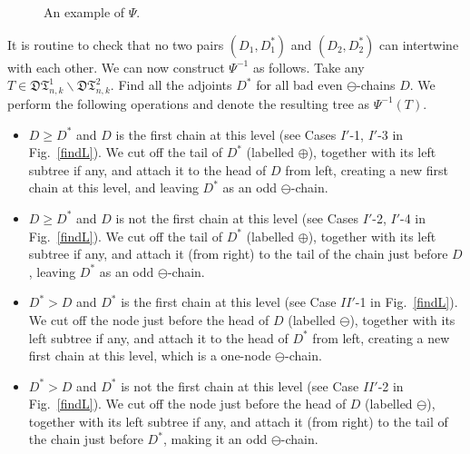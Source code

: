 \documentclass[12pt]{amsart}
\numberwithin{equation}{section}
\theoremstyle{plain}
\theoremstyle{definition}
\def\D{\mathfrak{D}}
\def\T{\mathfrak{T}}
\begin{document}
\begin{figure}[]
\caption{An example of $\Psi$.}
\label{bijexample}
\end{figure}




 It is routine to check that no two pairs $(D_1,D_1^*)$ and $(D_2,D_2^*)$ can intertwine with each other.
We can now construct $\Psi^{-1}$ as follows.  Take any $T\in \D\T^{1}_{n,k}\backslash \D\T^{2}_{n,k}$. Find all the adjoints $D^*$ for all bad even $\ominus$-chains $D$. We perform the following operations and denote the resulting tree as $\Psi^{-1}(T)$.
\begin{itemize}
\item $D\ge D^*$ and $D$ is the first chain at this level (see Cases $I'$-1, $I'$-3 in Fig.~\ref{findL}). We cut off the tail of $D^*$ (labelled $\oplus$), together with its left subtree if any, and attach it to the head of $D$ from left, creating a new first chain at this level, and leaving $D^*$ as an odd $\ominus$-chain.
\item $D\ge D^*$ and $D$ is not the first chain at this level (see Cases $I'$-2, $I'$-4 in Fig.~\ref{findL}). We cut off the tail of $D^*$ (labelled $\oplus$), together with its left subtree if any, and attach it (from right) to the tail of the chain just before $D$, leaving $D^*$ as an odd $\ominus$-chain.
\item $D^*>D$ and $D^*$ is the first chain at this level (see Case $II'$-1 in Fig.~\ref{findL}). We cut off the node just before the head of $D$ (labelled $\ominus$), together with its left subtree if any, and attach it to the head of $D^*$ from left, creating a new first chain at this level, which is a one-node $\ominus$-chain.
\item $D^*>D$ and $D^*$ is not the first chain at this level (see Case $II'$-2 in Fig.~\ref{findL}). We cut off the node just before the head of $D$ (labelled $\ominus$), together with its left subtree if any, and attach it (from right) to the tail of the chain just before $D^*$, making it an odd $\ominus$-chain.
\end{itemize}
\end{document}
